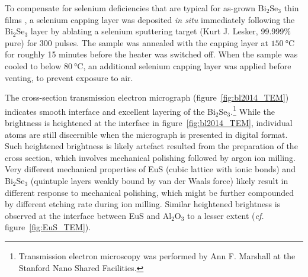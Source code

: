 To compensate for selenium deficiencies that are typical for as-grown Bi$_2$Se$_3$ thin films \cite{Zhanybek3, zhangli2012, zhangli2013, TI_ARPES1, ARPES_thickness}, a selenium capping layer was deposited \textit{in situ} immediately following the Bi$_2$Se$_3$ layer by ablating a selenium sputtering target (Kurt J. Lesker, 99.999\% pure) for 300 pulses. The sample was annealed with the capping layer at $\SI{150}{\degreeCelsius}$ for roughly 15 minutes before the heater was switched off. When the sample was cooled to below $\SI{80}{\degreeCelsius}$, an additional selenium capping layer was applied before venting, to prevent exposure to air.

The cross-section transmission electron micrograph (figure~\ref{fig:bl2014_TEM}) indicates smooth interface and excellent layering of the Bi$_2$Se$_3$.\footnote{Transmission electron microscopy was performed by Ann F. Marshall at the Stanford Nano Shared Facilities.} While the brightness is heightened at the interface in figure~\ref{fig:bl2014_TEM}, individual atoms are still discernible when the micrograph is presented in digital format. Such heightened brightness is likely artefact resulted from the preparation of the cross section, which involves mechanical polishing followed by argon ion milling. Very different mechanical properties of EuS (cubic lattice with ionic bonds) and Bi$_2$Se$_3$ (quintuple layers weakly bound by van der Waals force) likely result in different response to mechanical polishing, which might be further compounded by different etching rate during ion milling. Similar heightened brightness is observed at the interface between EuS and Al$_2$O$_3$ to a lesser extent (\textit{cf.} figure~\ref{fig:EuS_TEM}).

